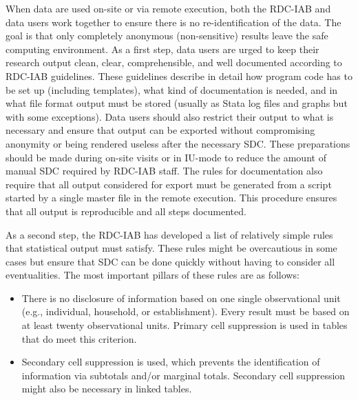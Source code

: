 When data are used on-site or via remote execution, both the RDC-IAB and data users work together to ensure there is no re-identification of the data. The goal is that only completely anonymous (non-sensitive) results leave the safe computing environment. As a first step, data users are urged to keep their research output clean, clear, comprehensible, and well documented according to RDC-IAB guidelines. These guidelines describe in detail how program code has to be set up (including templates), what kind of documentation is needed, and in what file format output must be stored (usually as Stata log files and graphs but with some exceptions). Data users should also restrict their output to what is necessary and ensure that output can be exported without compromising anonymity or being rendered useless after the necessary SDC. These preparations should be made during on-site visits or in IU-mode to reduce the amount of manual SDC required by RDC-IAB staff. The rules for documentation also require that all output considered for export must be generated from a script started by a single master file in the remote execution. This procedure ensures that all output is reproducible and all steps documented.

As a second step, the RDC-IAB has developed a list of relatively simple rules that statistical output must satisfy. These rules might be overcautious in some cases but ensure that SDC can be done quickly without having to consider all eventualities. The most important pillars of these rules are as follows:

\begin{itemize}
\tightlist
\item
  There is no disclosure of information based on one single observational unit (e.g., individual, household, or establishment). Every result must be based on at least twenty observational units. Primary cell suppression is used in tables that do meet this criterion.
\item
  Secondary cell suppression is used, which prevents the identification of information via subtotals and/or marginal totals. Secondary cell suppression might also be necessary in linked tables.
\end{itemize}

